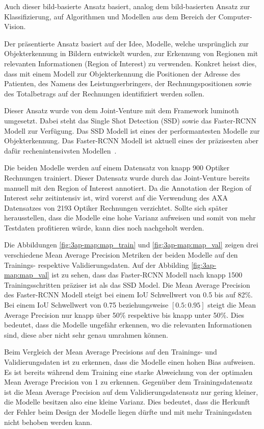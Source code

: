 Auch dieser bild-basierte Ansatz basiert, analog dem bild-basierten Ansatz zur Klassifizierung, auf Algorithmen und Modellen aus dem Bereich der Computer-Vision.

Der präsentierte Ansatz basiert auf der Idee, Modelle, welche ursprünglich zur Objekterkennung in Bildern entwickelt wurden, zur Erkennung von Regionen mit relevanten Informationen (Region of Interest) zu verwenden. Konkret heisst dies, dass mit einem Modell zur Objekterkennung die Positionen der Adresse des Patienten, des Namens des Leistungserbringers, der Rechnungspositionen sowie des Totalbetrags auf der Rechnungen identifiziert werden sollen. 

Dieser Ansatz wurde von dem Joint-Venture mit dem Framework luminoth umgesetzt. Dabei steht das Single Shot Detection (SSD) sowie das Faster-RCNN Modell zur Verfügung. Das SSD Modell ist eines der performantesten Modelle zur Objekterkennung. Das Faster-RCNN Modell ist aktuell eines der präzisesten aber dafür rechenintensivsten Modellen~\autocite{SSDFRCNN}.

Die beiden Modelle werden auf einem Datensatz von knapp 900 Optiker Rechnungen trainiert. Dieser Datensatz wurde durch das Joint-Venture bereits manuell mit den Region of Interest annotiert. Da die Annotation der Region of Interest sehr zeitintensiv ist, wird vorerst auf die Verwendung des AXA Datensatzes von 2193 Optiker Rechnungen verzichtet. Sollte sich später herausstellen, dass die Modelle eine hohe Varianz aufweisen und somit von mehr Testdaten profitieren würde, kann dies noch nachgeholt werden.

Die Abbildungen \ref{fig:3ap-map:map_train} und \ref{fig:3ap-map:map_val} zeigen drei verschiedene Mean Average Precision Metriken der beiden Modelle auf den Trainings- respektive Validierungsdaten. Auf der Abbilding \ref{fig:3ap-map:map_val} ist zu sehen, dass das Faster-RCNN Modell nach knapp 1500 Trainingsschritten präziser ist als das SSD Model. Die Mean Average Precision des Faster-RCNN Modell steigt bei einem IoU Schwellwert von 0.5 bis auf 82\%. Bei einem IoU Schwellwert von 0.75 beziehungsweise $[0.5:0.95]$ steigt die Mean Average Precision nur knapp über 50\% respektive bis knapp unter 50\%. Dies bedeutet, dass die Modelle ungefähr erkennen, wo die relevanten Informationen sind, diese aber nicht sehr genau umrahmen können.

Beim Vergleich der Mean Average Precisions auf den Trainings- und Validierungsdaten ist zu erkennen, dass die Modelle einen hohen Bias aufweisen. Es ist bereits während dem Training eine starke Abweichung von der optimalen Mean Average Precision von 1 zu erkennen. Gegenüber dem Trainingsdatensatz ist die Mean Average Precision auf dem Validierungsdatensatz nur gering kleiner, die Modelle besitzen also eine kleine Varianz. Dies bedeutet, dass die Herkunft der Fehler beim Design der Modelle liegen dürfte und mit mehr Trainingsdaten nicht behoben werden kann. 

